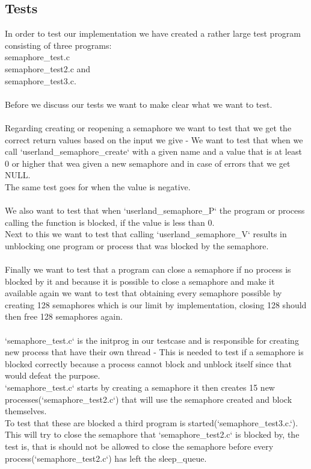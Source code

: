 \documentclass[a4paper,12pt,danish]{report}
\begin{document}
\subsection{Tests}
In order to test our implementation we have created a rather large test program consisting of three programs:
\\
semaphore\_test.c
\\
semaphore\_test2.c and
\\
semaphore\_test3.c.
\\
\\
Before we discuss our tests we want to make clear what we want to test.
\\
\\
Regarding creating or reopening a semaphore we want to test that we get the correct return values based on the input we give - We want to test that when we call `userland\_semaphore\_create` with a given name and a value that is at least 0 or higher that wea given a new semaphore and in case of errors that we get NULL.
\\
The same test goes for when the value is negative.
\\
\\
We also want to test that when `userland\_semaphore\_P` the program or process calling the function is blocked, if the value is less than 0.
\\
Next to this we want to test that calling `userland\_semaphore\_V` results in unblocking one program or process that was blocked by the semaphore.
\\
\\
Finally we want to test that a program can close a semaphore if no process is blocked by it and because it is possible to close a semaphore and make it available again we want to test that obtaining every semaphore possible by creating 128 semaphores which is our limit by implementation, closing 128 should then free 128 semaphores again.
\\
\\
`semaphore\_test.c` is the initprog in our testcase and is responsible for creating new process that have their own thread - This is needed to test if a semaphore is blocked correctly because a process cannot block and unblock itself since that would defeat the purpose.
\\
`semaphore\_test.c` starts by creating a semaphore it then creates 15 new processes(`semaphore\_test2.c`) that will use the semaphore created and block themselves.
\\
To test that these are blocked a third program is started(`semaphore\_test3.c.`). This will try to close the semaphore that `semaphore\_test2.c` is blocked by, the test is, that is should not be allowed to close the semaphore before every process(`semaphore\_test2.c`) has left the sleep\_queue.
\end{document}
